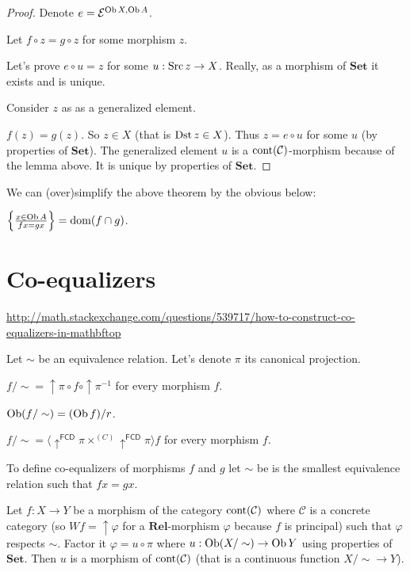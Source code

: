 \begin{proof}
  Denote $e = \mathcal{E}^{\operatorname{Ob} X, \operatorname{Ob} A}$.
  
  Let $f \circ z = g \circ z$ for some morphism $z$.
  
  Let's prove $e \circ u = z$ for some $u : \operatorname{Src} z \rightarrow X$.
  Really, as a morphism of $\mathbf{Set}$ it exists and is unique.
  
  Consider $z$ as as a generalized element.
  
  $f (z) = g (z)$. So $z \in X$ (that is $\operatorname{Dst} z \in X$). Thus $z = e
  \circ u$ for some $u$ (by properties of $\mathbf{Set}$). The
  generalized element $u$ is a $\operatorname{cont} (\mathcal{C})$-morphism
  because of the lemma above. It is unique by properties of
  $\mathbf{Set}$.
\end{proof}

We can (over)simplify the above theorem by the obvious below:

\begin{obvious}
$\left\{ \frac{ x \in \operatorname{Ob} A }{ f x = g x }\right\} = \operatorname{dom} (f \cap g)$.
\end{obvious}

\section{Co-equalizers}

\url{http://math.stackexchange.com/questions/539717/how-to-construct-co-equalizers-in-mathbftop}	

Let $\sim$ be an equivalence relation. Let's denote $\pi$ its canonical
projection.

\begin{defn}
  $f / \sim = \uparrow \pi \circ f \circ \uparrow \pi^{- 1}$ for every
  morphism $f$.
\end{defn}

\begin{obvious}
$\operatorname{Ob} (f / \sim) = (\operatorname{Ob} f) / r$.
\end{obvious}

\begin{obvious}
$f / \sim = \langle \uparrow^{\mathsf{FCD}} \pi \times^{(C)}
\uparrow^{\mathsf{FCD}} \pi \rangle f$ for every morphism
$f$.
\end{obvious}

To define co-equalizers of morphisms $f$ and $g$ let $\sim$ be is the smallest
equivalence relation such that $f x = g x$.

\begin{lem}
  Let $f : X \rightarrow Y$ be a morphism of the category
  $\operatorname{cont} (\mathcal{C})$ where $\mathcal{C}$ is a concrete
  category (so $W f = \uparrow \varphi$ for a $\mathbf{Rel}$-morphism
  $\varphi$ because $f$ is principal) such that $\varphi$ respects $\sim$.
  Factor it $\varphi = u \circ \pi$ where $u : \operatorname{Ob} (X / \sim)
  \rightarrow \operatorname{Ob} Y$ using properties of $\mathbf{Set}$. Then
  $u$ is a morphism of $\operatorname{cont} (\mathcal{C})$ (that is a
  continuous function $X / \sim \rightarrow Y$).
\end{lem}

